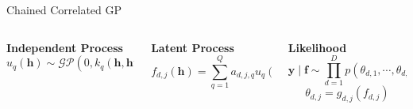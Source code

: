 \begin{frame}{Chained Correlated GP }
	\scriptsize
	\begin{columns}[T] %
		\begin{column}{0.33\textwidth}
			\centering	
			\textcolor{mygreen}{
				\textbf{Independent Process}
				\vspace{-1.3em}
							\begin{equation*}
									u_{q}(\mathbf{h}) \sim \mathcal{GP}(0, k_{q}(\mathbf{h}, \mathbf{h}'))
								\end{equation*}
			}
		\end{column}
		
		\begin{column}{0.33\textwidth}
			\centering
			\textcolor{myblue}{
				\textbf{Latent Process}
				\vspace{-1.3em}
							\begin{equation*}
									f_{d,j}(\mathbf{h}) = \sum_{q=1}^Q a_{d,j,q} u_{q}(\mathbf{h})
								\end{equation*}
			}
		\end{column}
		
		\begin{column}{0.33\textwidth}
			\centering
			\textcolor{myred}{
				\textbf{Likelihood}
				\vspace{-1.3em}
							\begin{equation*}
									\mathbf{y} \mid \mathbf{f} \sim \prod_{d=1}^D p(\theta_{d, 1}, \cdots, \theta_{d, J_d})
								\end{equation*}
							\vspace{-1.5em}
							\begin{equation*}
									\theta_{d, j} = g_{d, j}(f_{d, j})
								\end{equation*}
			}
		\end{column}
		
	\end{columns}
\end{frame}